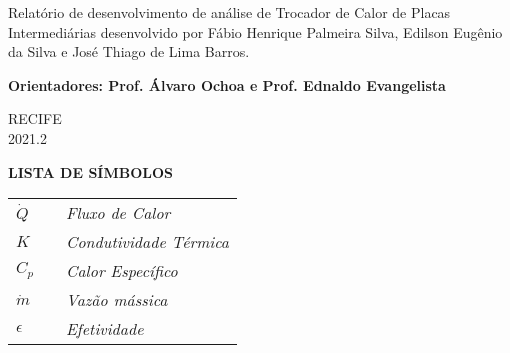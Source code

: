 \documentclass[a4paper,12pt,oneside]{article}
\begin{document}
\hfill\begin{minipage}{0.5\linewidth}\large
{Relatório de desenvolvimento de análise de Trocador de Calor de Placas Intermediárias desenvolvido por Fábio Henrique Palmeira Silva, Edilson Eugênio da Silva e José Thiago de Lima Barros.} 
\end{minipage}
\vspace{0.9cm}
\begin{flushright}
\large \textbf{	Orientadores: Prof. Álvaro Ochoa e Prof. Ednaldo Evangelista}
\end{flushright}

\begin{center}
\large{
\vspace{2.9cm}
RECIFE\\
\vspace{0.2cm}
2021.2	
}
\end{center}
\thispagestyle{empty}




\pagebreak
\clearpage
\newpage	


\begin{center}
	\renewcommand{\listfigurename}{\large LISTA DE ILUSTRAÇÕES}
	\listoffigures
	\thispagestyle{empty}
\end{center}



\pagebreak
\clearpage
\newpage	

\begin{center}
	\renewcommand{\listtablename}{\large LISTA DE TABELAS}
	\listoftables
	\thispagestyle{empty}
\end{center}

\pagebreak
\clearpage
\newpage


\large \centering \textbf {LISTA DE SÍMBOLOS }\\
\vspace{0.5cm}
\begin{flushleft}
	\begin{tabularx}{12cm}{X X l}
	
		$\dot{Q}$ &  &  \itshape Fluxo de Calor\\
		$K$ &  &  \itshape Condutividade Térmica\\
		$C_{p}$ &  &  \itshape Calor Específico\\
		$\dot{m}$ &  &  \itshape Vazão mássica\\
		$\epsilon$ &  &  \itshape Efetividade
\end{tabularx}
\end{flushleft}
\thispagestyle{empty}
\end{document}
